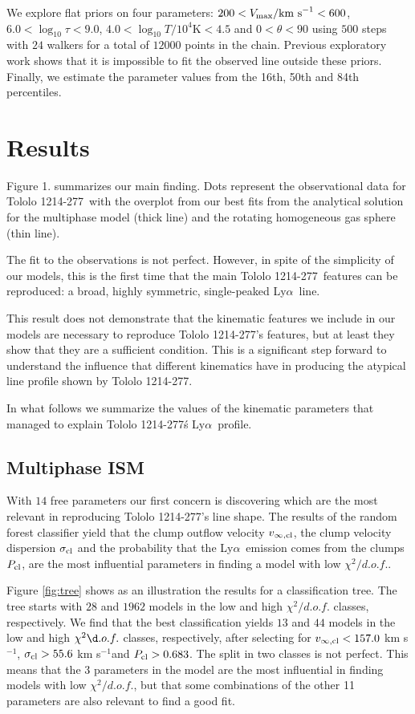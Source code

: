 \documentclass[a4,useAMS,usenatbib,usegraphicx]{mn2e}
\newcommand{\tol}{Tololo 1214-277}
\newcommand{\lya}{Ly$\alpha$}
\newcommand{\kms}{km s$^{-1}$}
\begin{document}
We explore flat priors on four parameters: $200<V_{\rm
  max}/\mathrm{km\ s}^{-1} <600$,   $6.0<\log_{10}\tau<9.0$,
$4.0<\log_{10} T/10^4\mathrm{K}< 4.5$ and $0<\theta<90$ using $500$
steps with $24$ walkers for a total of $12000$ points in the chain.
Previous exploratory work shows that it is impossible to fit the
observed line outside these priors.
Finally, we estimate the parameter values from the 16th, 50th and 84th
percentiles. 


\section{Results}


Figure 1. summarizes our main finding.
Dots represent the observational data for \tol\ with the
overplot from our best fits from the analytical solution for the
multiphase model (thick line)  and the rotating homogeneous gas sphere
(thin line). 

The fit to the observations is not perfect. 
However, in spite of the
simplicity of our models, this is the first time that the main
\tol\ features can be reproduced: a broad, highly symmetric,
single-peaked \lya\ line. 

This result does not demonstrate that the kinematic features we
include in our models are necessary to reproduce \tol's features, but
at least they show that they are a sufficient condition.
This is a significant step forward to understand the influence that
different kinematics have in producing the atypical line profile shown
by \tol.


In what follows we summarize the values of the kinematic parameters
that managed to explain \tol\'s \lya\ profile.


\subsection{Multiphase ISM}

With $14$ free parameters our first concern is discovering which are
the most relevant in reproducing \tol's line shape.
The results of the random forest classifier yield that the clump outflow velocity
$v_{\infty,\rm{cl}}$, the clump velocity dispersion $\sigma_{\rm cl}$ and the probability
that the \lya\ emission comes from the clumps $P_{\rm cl}$, are the
most influential parameters in finding a model with low
$\chi^2/d.o.f.$.

Figure \ref{fig:tree} shows as an illustration the results for a
classification tree.  
The tree starts with $28$ and $1962$ models in the low and high
$\chi^2/d.o.f.$ classes, respectively. 
We find that the best classification
yields $13$ and $44$ models in the low and high $\chi^2\d.o.f.$
classes, respectively, after selecting for $v_{\infty,{\rm cl}}<157.0$ \kms,
$\sigma_{{\rm cl}}>55.6$ \kms and $P_{\rm cl}>0.683$. 
The split in two classes is not perfect. 
This means that the 3 parameters in the
model are the most influential in finding models with low
$\chi^2/d.o.f.$, but that some combinations of the other 11 parameters
are also relevant to find a good fit.  
\end{document}
